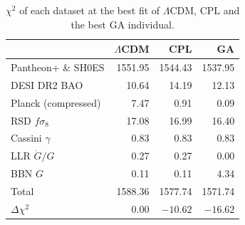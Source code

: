 \begin{table}
\caption{\label{tab:chi2}$\chi^2$ of each dataset at the best fit of $\Lambda$CDM, CPL and the best GA individual.}
\begin{ruledtabular}
\begin{tabular}{lrrr}
 & $\Lambda$CDM & CPL & GA \\
\hline
Pantheon+ \& SH0ES          & 1551.95 & 1544.43 & 1537.95 \\
DESI DR2 BAO                &   10.64 &   14.19 &   12.13 \\
Planck (compressed)         &    7.47 &    0.91 &    0.09 \\
RSD $f\sigma_8$             &   17.08 &   16.99 &   16.40 \\
Cassini $\gamma$            &    0.83 &    0.83 &    0.83 \\
LLR $\dot{G}/G$             &    0.27 &    0.27 &    0.00 \\
BBN $G$                     &    0.11 &    0.11 &    4.34 \\
\hline
Total                       & 1588.36 & 1577.74 & 1571.74 \\
$\Delta\chi^2$              &    0.00 & $-10.62$ & $-16.62$ \\
\end{tabular}
\end{ruledtabular}
\end{table}
